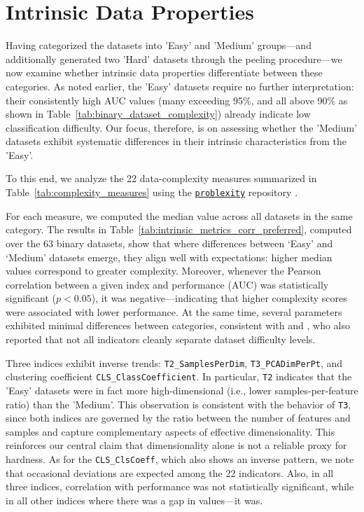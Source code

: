 \documentclass[preprint,12pt,authoryear]{elsarticle}
\begin{document}

\section{Intrinsic Data Properties}\label{sec:intrinsic}

Having categorized the datasets into 'Easy' and 'Medium' groups—and additionally generated two 'Hard' datasets through the peeling procedure—we now examine whether intrinsic data properties differentiate between these categories. As noted earlier, the 'Easy' datasets require no further interpretation: their consistently high AUC values (many exceeding 95\%, and all above 90\% as shown in Table~\ref{tab:binary_dataset_complexity}) already indicate low classification difficulty. Our focus, therefore, is on assessing whether the 'Medium' datasets exhibit systematic differences in their intrinsic characteristics from the 'Easy'. 

To this end, we analyze the 22 data-complexity measures summarized in Table~\ref{tab:complexity_measures} using the \href{https://github.com/w4k2/problexity?utm_source=chatgpt.com}{\texttt{problexity}} repository \citep{problexity}.  

For each measure, we computed the median value across all datasets in the same category. The results in Table~\ref{tab:intrinsic_metrics_corr_preferred}, computed over the 63 binary datasets, show that where differences between ‘Easy’ and ‘Medium’ datasets emerge, they align well with expectations: higher median values correspond to greater complexity. Moreover, whenever the Pearson correlation between a given index and performance (AUC) was statistically significant ($p < 0.05$), it was negative—indicating that higher complexity scores were associated with lower performance. At the same time, several parameters exhibited minimal differences between categories, consistent with \citet{ho2002complexity} and \citet{lorena2012complex}, who also reported that not all indicators cleanly separate dataset difficulty levels. 


Three indices exhibit inverse trends: \texttt{T2\_SamplesPerDim}, \texttt{T3\_PCADimPerPt}, and clustering coefficient \texttt{CLS\_ClassCoefficient}.
In particular, \texttt{T2} indicates that the 'Easy' datasets were in fact more high-dimensional (i.e., lower samples-per-feature ratio) than the 'Medium'. 
This observation is consistent with the behavior of \texttt{T3}, since both indices are governed by the ratio between the number of features and samples and capture complementary aspects of effective dimensionality. This reinforces our central claim that dimensionality alone is not a reliable proxy for hardness.
As for the \texttt{CLS\_ClsCoeff}, which also shows an inverse pattern, we note that occasional deviations are expected among the 22 indicators. Also, in all three indices, correlation with performance was not statistically significant, while in all other indices where there was a gap in values—it was.
\end{document}
